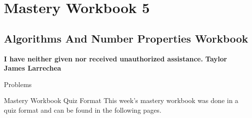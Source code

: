 \clearpage
\chapter{Mastery Workbook 5}

\section{Algorithms And Number Properties Workbook}


\begin{center}
    \Large{\textbf{I have neither given nor received unauthorized assistance.}}
    \large{\textbf{Taylor James Larrechea}}
\end{center}

\begin{problem}{Problems}
    \begin{statement}{Mastery Workbook Quiz Format}
        This week's mastery workbook was done in a quiz format and can be found in the following pages.
    \end{statement}

    \clearpage

    
\end{problem}